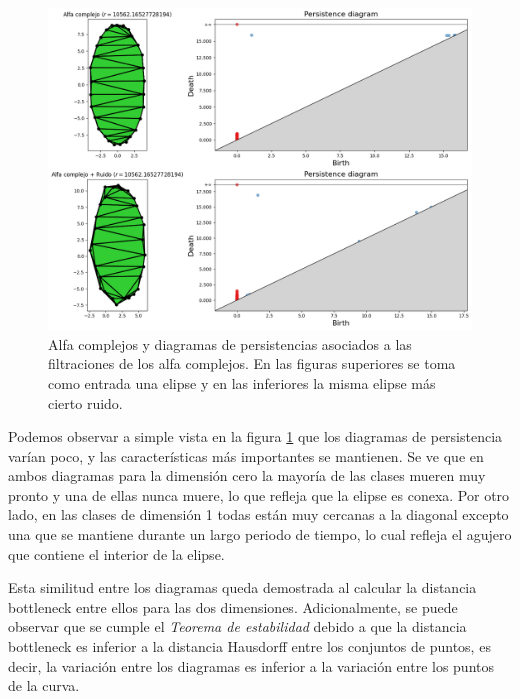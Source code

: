 \begin{figure}[!ht]
\centering
\includegraphics[width=\textwidth]{../code/output/ejemplo1.png} 
\caption{Alfa complejos y diagramas de persistencias asociados a las filtraciones de los alfa complejos. En las figuras superiores se toma como entrada una elipse y en las inferiores la misma elipse más cierto ruido.}
\label{ref:persEj1}
\end{figure} 

Podemos observar a simple vista en la figura \ref{ref:persEj1} que los diagramas de persistencia varían poco, y las características más importantes se mantienen. Se ve que en ambos diagramas para la dimensión cero la mayoría de las clases mueren muy pronto y una de ellas nunca muere, lo que refleja que la elipse es conexa. Por otro lado, en las clases de dimensión 1 todas están muy cercanas a la diagonal excepto una que se mantiene durante un largo periodo de tiempo, lo cual refleja el agujero que contiene el interior de la elipse.

Esta similitud entre los diagramas queda demostrada al calcular la distancia bottleneck entre ellos para las dos dimensiones. Adicionalmente, se puede observar que se cumple el \emph{Teorema de estabilidad} debido a que la distancia bottleneck es inferior a la distancia Hausdorff entre los conjuntos de puntos, es decir, la variación entre los diagramas es inferior a la variación entre los puntos de la curva.

\begin{minipage}{\linewidth}
\end{minipage}

